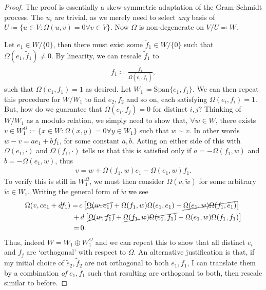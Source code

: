 \documentclass[11pt, final]{article}
\begin{document}
\begin{proof}
	The proof is essentially a skew-symmetric adaptation of the Gram-Schmidt process. The $u_i$ are trivial, as we merely need to select \textit{any} basis of $U \coloneqq \{u \in V : \Omega(u,v) = 0 \forall v \in V \}$. Now $\Omega$ is non-degenerate on $V/U \eqqcolon W$.
	
	Let $e_1 \in W/\{0\}$, then there must exist some $\tilde{f}_1 \in W/\{0\}$ such that $\Omega(e_1,\tilde{f}_1)\neq 0$. By linearity, we can rescale $\tilde{f}_1$ to
		\begin{align}
			f_1 \coloneqq \frac{\tilde{f}_1}{\Omega(e_1,\tilde{f}_1)},
		\end{align}
	such that $\Omega(e_1,f_1)=1$ as desired. Let $W_1 \coloneqq \mathrm{Span} \{e_1,f_1\}$. We can then repeat this procedure for $W/W_1$ to find $e_2,f_2$ and so on, each satisfying $\Omega(e_i,f_i) = 1$. But, how do we guarantee that $\Omega(e_i,f_j) = 0$ for distinct $i,j$? Thinking of $W/W_1$ as a modulo relation, we simply need to show that, $\forall w \in W$, there exists $v \in W^\Omega_1 \coloneqq \{ x \in W : \Omega(x,y) = 0 \forall y \in W_1\}$ such that $w \sim v$. In other words $w-v = a e_1 + b f_1$, for some constant $a,b$. Acting on either side of this with $\Omega(e_1, \cdot)$ and $\Omega(f_1, \cdot)$ tells us that this is satisfied only if $a = - \Omega(f_1,w)$ and $b = - \Omega(e_1,w)$, thus
		\begin{align}
			v = w + \Omega(f_1, w) e_1 - \Omega(e_1 ,w) f_1.
		\end{align}
	To verify this is still in $W_1^\Omega$, we must then consider $\Omega(v,\tilde{w})$ for some arbitrary $\tilde{w} \in W_1$. Writing the general form of $\tilde{w}$ we see
		\begin{align}
			\begin{split}
				\Omega(v,ce_1 + d f_1) = \, &c \left[ \cancel{\Omega(w,e_1)} + \Omega(f_1,w) \Omega(e_1,e_1) - \cancel{\Omega(e_1,w) \Omega(f_1,e_1)} \right] \\
									   + &\, d \left[ \cancel{\Omega(w,f_1)} + \cancel{\Omega(f_1,w) \Omega(e_1,f_1)} - \Omega(e_1,w) \Omega(f_1,f_1) \right] \\
									   = &\, 0.
			\end{split}
		\end{align}
	Thus, indeed $W = W_1 \oplus W_1^\Omega$ and we can repeat this to show that all distinct $e_i$ and $f_j$ are `orthogonal' with respect to $\Omega$. An alternative justification is that, if my initial choice of $\tilde{e}_2, \tilde{f}_2$ are not orthogonal to both $e_1, f_1$, I can translate them by a combination \textit{of} $e_1, f_1$ such that resulting are orthogonal to both, then rescale similar to before.
\end{proof}
\end{document}
